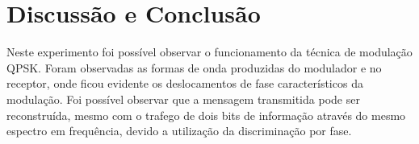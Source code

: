 \newpage
\section{Discussão e Conclusão}
Neste experimento foi possível observar o funcionamento da técnica de modulação QPSK. Foram observadas as formas de onda produzidas do modulador e no receptor, onde ficou evidente os deslocamentos de fase característicos da modulação. Foi possível observar que a mensagem transmitida pode ser reconstruída, mesmo com o trafego de dois bits de informação através do mesmo espectro em frequência, devido a utilização da discriminação por fase.